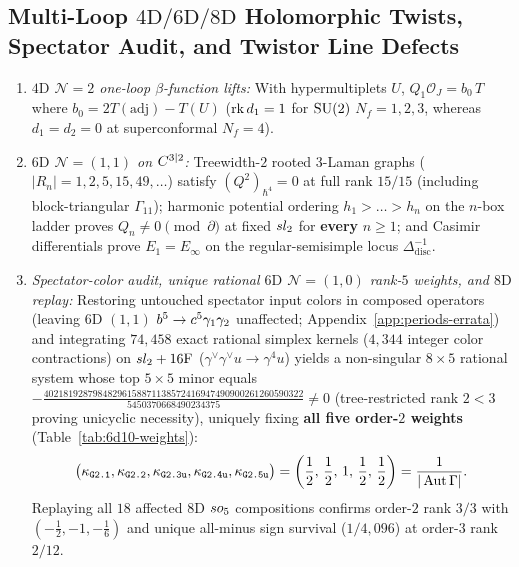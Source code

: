 \subsection{Multi-Loop \texorpdfstring{$4\mathrm{D}/6\mathrm{D}/8\mathrm{D}$}{4D/6D/8D} Holomorphic Twists, Spectator Audit, and Twistor Line Defects}
\label{subsec:6d-8d-twistor}

\begin{theorem}[{$4\mathrm{D}$ $\mathcal{N}=2$ $b_0$ lifts, $6\mathrm{D}$ $(1,1)$ $Q_4$ \& lifting, corrected $6\mathrm{D}$ $(1,0)$ rank-$5$ weights, $\C^3$ $\fso_8$ GS, and twistor defects~{\cite{BSS22,BW23,FP24,Repo9e833c8}}}]
\label{thm:6d-8d-twistor}
\leavevmode
\begin{enumerate}[label=(\arabic*),leftmargin=*]
  \item \emph{$4\mathrm{D}$ $\mathcal{N}=2$ one-loop $\beta$-function lifts:} With hypermultiplets $U$, $Q_1\mathcal{O}_J = b_0\,T$ where $b_0 = 2T(\mathrm{adj}) - T(U)$ ($\operatorname{rk} d_1 = 1$ for $\operatorname{SU}(2)$ $N_f = 1,2,3$, whereas $d_1 = d_2 = 0$ at superconformal $N_f = 4$).

  \item \emph{$6\mathrm{D}$ $\mathcal{N}=(1,1)$ on $C^{3|2}$:} Treewidth-$2$ rooted $3$-Laman graphs ($|R_n| = 1,2,5,15,49,\dots$) satisfy $(Q^2)_{\hbar^4} = 0$ at full rank $15/15$ (including block-triangular $\Gamma_{11}$); harmonic potential ordering $h_1 > \dots > h_n$ on the $n$-box ladder proves $Q_n \neq 0 \pmod{\partial}$ at fixed $sl_2$ for \textbf{every} $n \ge 1$; and Casimir differentials prove $E_1 = E_\infty$ on the regular-semisimple locus $\Delta_{\mathrm{disc}}^{-1}$.

  \item \emph{Spectator-color audit, unique rational $6\mathrm{D}$ $\mathcal{N}=(1,0)$ rank-$5$ weights, and $8\mathrm{D}$ replay:} Restoring untouched spectator input colors in composed operators (leaving $6\mathrm{D}$ $(1,1)$ $b^5 \to c^5\gamma_1\gamma_2$ unaffected; Appendix~\ref{app:periods-errata}) and integrating $74{,}458$ exact rational simplex kernels ($4{,}344$ integer color contractions) on $sl_2 + 16\mathrm{F}$ ($\gamma^\vee\gamma^\vee u \to \gamma^4 u$) yields a non-singular $8\times 5$ rational system whose top $5\times 5$ minor equals $-\frac{40218192879848296158871138572416947490900261260590322}{5450370668490234375} \neq 0$ (tree-restricted rank $2 < 3$ proving unicyclic necessity), uniquely fixing \textbf{all five order-$2$ weights} (Table~\ref{tab:6d10-weights}):
  \begin{equation}
  \label{eq:6d10-rank5-weights}
  \bigl(\kappa_{\texttt{G2.1}}, \kappa_{\texttt{G2.2}}, \kappa_{\texttt{G2.3u}}, \kappa_{\texttt{G2.4u}}, \kappa_{\texttt{G2.5u}}\bigr) = \left(\frac{1}{2},\, \frac{1}{2},\, 1,\, \frac{1}{2},\, \frac{1}{2}\right) = \frac{1}{|\operatorname{Aut}\Gamma|}.
  \end{equation}
  Replaying all $18$ affected $8\mathrm{D}$ $so_5$ compositions confirms order-$2$ rank $3/3$ with $(-\frac{1}{2},-1,-\frac{1}{6})$ and unique all-minus sign survival ($1/4{,}096$) at order-$3$ rank $2/12$.


\end{enumerate}
\end{theorem}
